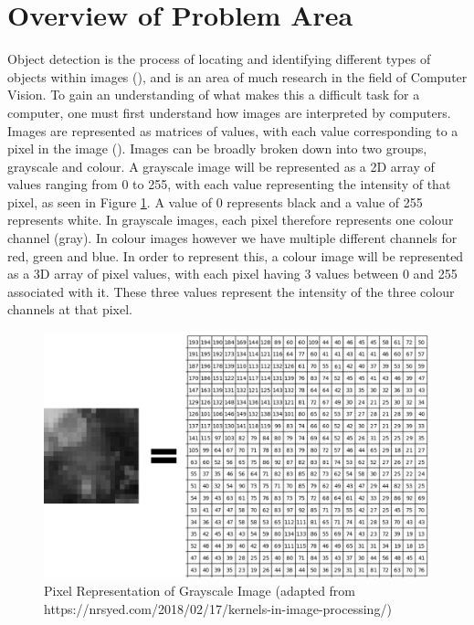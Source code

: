 \documentclass[12pt]{report}
\begin{document}
\section{Overview of Problem Area}
\begin{flushleft}
Object detection is the process of locating and identifying different types of objects within images (\cite{verschae2015object}), and is an area of much research in the field of Computer Vision. To gain an understanding of what makes this a difficult task for a computer, one must first understand how images are interpreted by computers. Images are represented as matrices of values, with each value corresponding to a pixel in the image (\cite{learned2011introduction}). Images can be broadly broken down into two groups, grayscale and colour. A grayscale image will be represented as a 2D array of values ranging from 0 to 255, with each value representing the intensity of that pixel, as seen in Figure \ref{fig:pixels}. A value of 0 represents black and a value of 255 represents white. In grayscale images, each pixel therefore represents one colour channel (gray). In colour images however we have multiple different channels for red, green and blue. In order to represent this, a colour image will be represented as a 3D array of pixel values, with each pixel having 3 values between 0 and 255 associated with it. These three values represent the intensity of the three colour channels at that pixel.
\end{flushleft}

\vspace{0.5cm}
\begin{figure}[ht!]
	\centering
	\includegraphics[width=12cm]{pixels}
	\caption{Pixel Representation of Grayscale Image (adapted from https://nrsyed.com/2018/02/17/kernels-in-image-processing/)}
	\label{fig:pixels}
\end{figure}
\end{document}
